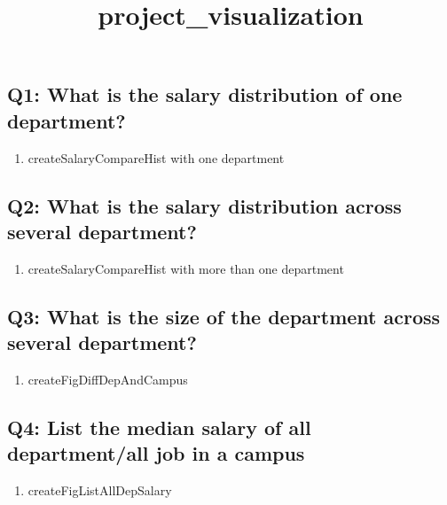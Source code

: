 \documentclass[11pt]{article}
\title{project\_visualization}
\providecommand{\tightlist}{%
      \setlength{\itemsep}{0pt}\setlength{\parskip}{0pt}}
\begin{document}
    
    
    \maketitle
    
    

    
    \subsection{Q1: What is the salary distribution of one
department?}\label{q1-what-is-the-salary-distribution-of-one-department}

\begin{enumerate}
\def\labelenumi{\arabic{enumi}.}
\tightlist
\item
  createSalaryCompareHist with one department
\end{enumerate}

\subsection{Q2: What is the salary distribution across several
department?}\label{q2-what-is-the-salary-distribution-across-several-department}

\begin{enumerate}
\def\labelenumi{\arabic{enumi}.}
\tightlist
\item
  createSalaryCompareHist with more than one department
\end{enumerate}

\subsection{Q3: What is the size of the department across several
department?}\label{q3-what-is-the-size-of-the-department-across-several-department}

\begin{enumerate}
\def\labelenumi{\arabic{enumi}.}
\tightlist
\item
  createFigDiffDepAndCampus
\end{enumerate}

\subsection{Q4: List the median salary of all department/all job in a
campus}\label{q4-list-the-median-salary-of-all-departmentall-job-in-a-campus}

\begin{enumerate}
\def\labelenumi{\arabic{enumi}.}
\tightlist
\item
  createFigListAllDepSalary
\end{enumerate}
\end{document}
